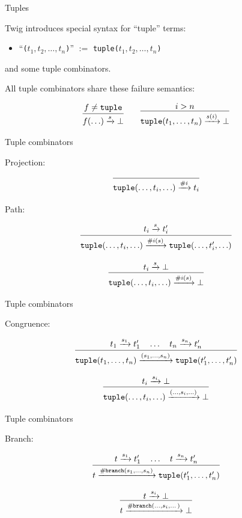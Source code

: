 \documentclass{beamer}
\newcommand{\arr}[1]{\ensuremath\xrightarrow{#1}}
\begin{document}
\begin{frame}{Tuples}

Twig introduces special syntax for ``tuple'' terms:

\begin{itemize}
  \item ``\texttt{(}$t_1,t_2,\ldots,t_n$\texttt{)}'' 
        $:=$ \texttt{tuple(}$t_1,t_2,\ldots,t_n$\texttt{)}
\end{itemize}

and some tuple combinators.

All tuple combinators share these failure semantics:

\[
\infer{f(\ldots) \arr{s} \bot}
{f \neq \mathtt{tuple}}
\qquad
\infer{\mathtt{tuple}(t_1,\ldots,t_n) \arr{s(i)} \bot}{i > n}
\]

\end{frame}

\begin{frame}{Tuple combinators}

Projection:

\[
\infer{\mathtt{tuple}(\ldots,t_i,\ldots) \arr{\#i} t_i}{}
\]

Path:

\[
\infer{\mathtt{tuple}(\ldots,t_i,\ldots) \arr{\#i(s)} 
\mathtt{tuple}(\ldots,t_i',\ldots)}
{t_i \arr{s} t_i'}
\]

\[
\infer{\mathtt{tuple}(\ldots,t_i,\ldots) \arr{\#i(s)} \bot}
{t_i \arr{s} \bot}
\]

\end{frame}


\begin{frame}{Tuple combinators}

Congruence:

\[
\infer{
\mathtt{tuple}(t_1,\ldots,t_n)
\arr{(s_1,\ldots,s_n)}
\mathtt{tuple}(t_1',\ldots,t_n') }
{t_1 \arr{s_1} t_1' \quad \ldots \quad t_n \arr{s_n} t_n'}
\]

\[
\infer{
\mathtt{tuple}(\ldots,t_i,\ldots)
\arr{(\ldots,s_i,\ldots)}
\bot}
{t_i \arr{s_i} \bot}
\]

\end{frame}


\begin{frame}{Tuple combinators}

Branch:

\[
\infer{
  t \arr{\mathtt{\#branch}(s_1,\ldots,s_n)}
  \mathtt{tuple}(t_1',\ldots,t_n')
}{t \arr{s_1} t_1' \quad \ldots \quad t \arr{s_n} t_n'}
\]

\[
\infer
{t \arr{\mathtt{\#branch}(\ldots,s_i,\dots)} \bot}
{t \arr{s_i} \bot}
\]

\end{frame}
\end{document}
